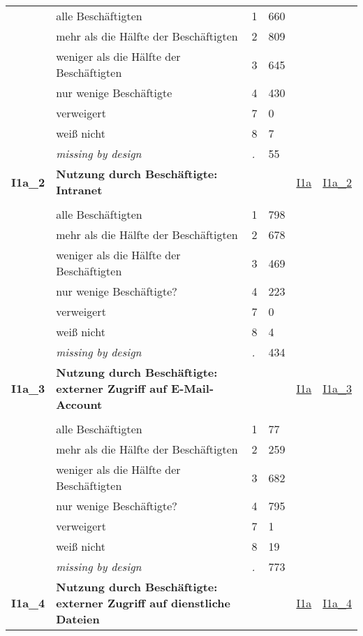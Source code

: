 \begin{longtable}{| L{2.45cm} | L{6cm} | C{1.5cm} | R{1cm} | C{2.25cm} | C{2.25cm} |}
   & alle Beschäftigten & 1 & 660 &  &  \\ 
   & mehr als die Hälfte der Beschäftigten & 2 & 809 &  &  \\ 
   & weniger als die Hälfte der Beschäftigten & 3 & 645 &  &  \\ 
   & nur wenige Beschäftigte & 4 & 430 &  &  \\ 
   & verweigert & 7 & 0 &  &  \\ 
   & weiß nicht & 8 & 7 &  &  \\ 
   & \textit{missing by design} & \textit{.} & 55 &  &  \\ 
   \midrule
\textbf{I1a\_2}\label{var:I1a:2} & \textbf{Nutzung durch Beschäftigte: Intranet} &  &  & \hyperref[I1a]{I1a} & \hyperref[var:suf:I1a:2]{I1a\_2} \\ 
   &  &  &  &  &  \\ 
   & alle Beschäftigten & 1 & 798 &  &  \\ 
   & mehr als die Hälfte der Beschäftigten & 2 & 678 &  &  \\ 
   & weniger als die Hälfte der Beschäftigten & 3 & 469 &  &  \\ 
   & nur wenige Beschäftigte? & 4 & 223 &  &  \\ 
   & verweigert & 7 & 0 &  &  \\ 
   & weiß nicht & 8 & 4 &  &  \\ 
   & \textit{missing by design} & \textit{.} & 434 &  &  \\ 
   \midrule
\textbf{I1a\_3}\label{var:I1a:3} & \textbf{Nutzung durch Beschäftigte: externer Zugriff auf E-Mail-Account} &  &  & \hyperref[I1a]{I1a} & \hyperref[var:suf:I1a:3]{I1a\_3} \\ 
   &  &  &  &  &  \\ 
   & alle Beschäftigten & 1 & 77 &  &  \\ 
   & mehr als die Hälfte der Beschäftigten & 2 & 259 &  &  \\ 
   & weniger als die Hälfte der Beschäftigten & 3 & 682 &  &  \\ 
   & nur wenige Beschäftigte? & 4 & 795 &  &  \\ 
   & verweigert & 7 & 1 &  &  \\ 
   & weiß nicht & 8 & 19 &  &  \\ 
   & \textit{missing by design} & \textit{.} & 773 &  &  \\ 
   \midrule
\textbf{I1a\_4}\label{var:I1a:4} & \textbf{Nutzung durch Beschäftigte: externer Zugriff auf dienstliche Dateien} &  &  & \hyperref[I1a]{I1a} & \hyperref[var:suf:I1a:4]{I1a\_4} \\ 

\end{longtable}
